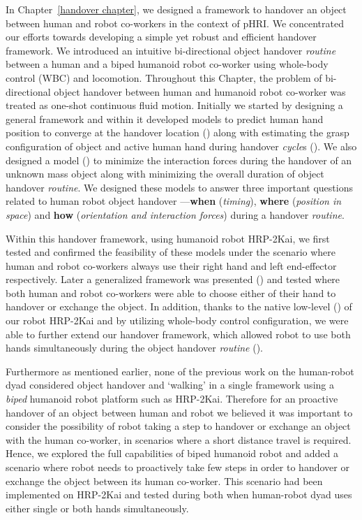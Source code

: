 In Chapter~\ref{handover chapter}, we designed a framework to handover an object between human and robot co-workers in the context of pHRI. We concentrated our efforts towards developing a simple yet robust and efficient handover framework. We introduced an intuitive bi-directional object handover \textit{routine} between a human and a biped humanoid robot co-worker using whole-body control (WBC) and locomotion. Throughout this Chapter, the problem of bi-directional object handover between human and humanoid robot co-worker was treated as one-shot continuous fluid motion. Initially we started by designing a general framework and within it developed models to predict human hand position to converge at the handover location () along with estimating the grasp configuration of object and active human hand during handover \textit{cycle}s (). We also designed a model () to minimize the interaction forces during the handover of an unknown mass object along with minimizing the overall duration of object handover \textit{routine}. We designed these models to answer three important questions related to human robot object handover ---\textbf{when} (\textit{timing}), \textbf{where} (\textit{position in space}) and \textbf{how} (\textit{orientation and interaction forces}) during a handover \textit{routine}. 
 
Within this handover framework, using humanoid robot HRP-2Kai, we first tested and confirmed the feasibility of these models under the scenario where human and robot co-workers always use their right hand and left end-effector respectively. Later a generalized framework was presented () and tested where both human and robot co-workers were able to choose either of their hand to handover or exchange the object. In addition, thanks to the native low-level () of our robot HRP-2Kai and by utilizing whole-body control configuration, we were able to further extend our handover framework, which allowed robot to use both hands simultaneously during the object handover \textit{routine} (). 

Furthermore as mentioned earlier, none of the previous work on the human-robot dyad considered object handover and `walking' in a single framework using a \textit{biped} humanoid robot platform such as HRP-2Kai. Therefore for an proactive handover of an object between human and robot we believed it was important to consider the possibility of robot taking a step to handover or exchange an object with the human co-worker, in scenarios where a short distance travel is required. Hence, we explored the full capabilities of biped humanoid robot and added a scenario where robot needs to proactively take few steps in order to handover or exchange the object between its human co-worker. This scenario had been implemented on HRP-2Kai and tested during both when human-robot dyad uses either single or both hands simultaneously. 
 
